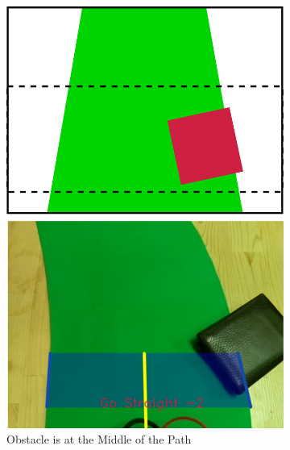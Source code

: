 \documentclass[a4paper,12pt]{article}
\begin{document}
\begin{figure}[H]
\begin{subfigure}{.31\textwidth}
		\includegraphics[width=0.30\unitlength]{images/path_images/down_2}
		\caption{\label{fig:dataP_down_2} Obstacle is at the Middle of the Path}
	\end{subfigure}
		\begin{subfigure}{.31\textwidth}
		\centering

\end{subfigure}
\end{figure}
\end{document}
